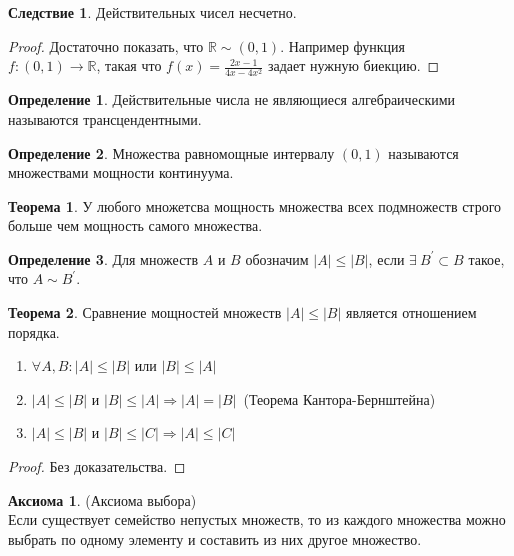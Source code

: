 \documentclass[a4paper, 12pt]{article}
\newcommand{\R}{\mathbb{R}}
\theoremstyle{definition}
\newtheorem*{definition}{Определение}
\newtheorem*{theorem}{Теорема}
\newtheorem*{consequense}{Следствие}
\newtheorem*{axiom}{Аксиома}
\begin{document}
        \begin{consequense}
            Действительных чисел несчетно.
        \end{consequense} 
        \begin{proof}
            Достаточно показать, что $\R \sim (0,1)$. Например функция\\
            $f:(0,1)\to \R$, такая что $f(x)=\frac{2x-1}{4x-4x^2}$ задает нужную биекцию.
        \end{proof} 
        \begin{definition}
            Действительные числа не являющиеся алгебраическими называются трансцендентными.
        \end{definition} 
        \begin{definition}
            Множества равномощные интервалу $(0,1)$ называются множествами мощности континуума.
        \end{definition} 
        \begin{theorem}
            У любого множетсва мощность множества всех подмножеств строго больше чем мощность самого множества.
        \end{theorem}
        \begin{definition}
            Для множеств $A$ и $B$ обозначим $|A|\leq |B|$, если $\exists \ B^{\prime} \subset B$ такое, что $A\sim B^{\prime}$.
        \end{definition} 
        \begin{theorem}
            Сравнение мощностей множеств $|A|\leq |B|$ является отношением порядка.
            \begin{enumerate}
                \item $\forall A,B: |A|\leq |B|$ или $|B|\leq |A|$ 
                \item $|A|\leq |B|$ и $|B|\leq |A| \Rightarrow |A|=|B|$\ (Теорема Кантора-Бернштейна)
                \item $|A|\leq |B|$ и $|B|\leq |C| \Rightarrow |A|\leq |C|$
            \end{enumerate}
        \end{theorem}
        \begin{proof}
            Без доказательства.
        \end{proof}
        \begin{axiom}(Аксиома выбора)\\
            Если существует семейство непустых множеств, то из каждого множества можно выбрать по одному элементу и составить из них другое множество.
        \end{axiom}
\end{document}
